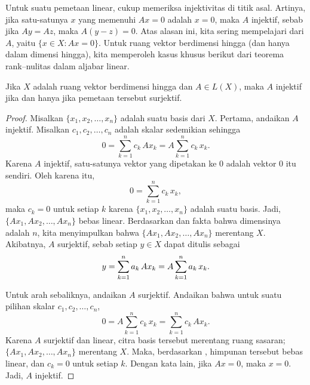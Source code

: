 Untuk suatu pemetaan linear, cukup memeriksa injektivitas di titik asal.
Artinya, jika satu-satunya $x$ yang memenuhi $Ax =0$ adalah $x=0$, maka $A$ injektif,
sebab jika $Ay=Az$, maka $A(y-z) = 0$.  Atas alasan ini, 
kita sering mempelajari \emph{} dari $A$, yaitu
$\{ x \in X : Ax = 0 \}$.
Untuk ruang vektor berdimensi hingga (dan hanya dalam dimensi hingga),
kita memperoleh kasus khusus berikut dari
teorema rank--nulitas dalam aljabar linear.

\begin{prop} \label{mv:prop:lin11onto}
Jika $X$ adalah ruang vektor berdimensi hingga dan $A \in L(X)$, maka $A$ injektif jika dan hanya jika pemetaan tersebut surjektif.
\end{prop}

\begin{proof}
Misalkan $\{ x_1,x_2,\ldots,x_n \}$ adalah suatu basis dari $X$.
Pertama, andaikan $A$ injektif.  Misalkan $c_1,c_2,\ldots,c_n$ adalah skalar sedemikian sehingga
\begin{equation*}
0 =
\sum_{k=1}^n c_k \, Ax_k =
A\sum_{k=1}^n c_k \, x_k 
.
\end{equation*}
Karena $A$ injektif,
satu-satunya vektor yang dipetakan ke 0 adalah vektor 0 itu sendiri.  
Oleh karena itu,
\begin{equation*}
0 =
\sum_{k=1}^n c_k \, x_k,
\end{equation*}
maka $c_k = 0$ untuk setiap $k$ karena $\{ x_1,x_2,\ldots,x_n \}$ adalah suatu basis.
Jadi, $\{ Ax_1, Ax_2, \ldots, Ax_n \}$ bebas linear.
Berdasarkan 
dan fakta bahwa dimensinya adalah $n$, kita menyimpulkan bahwa
$\{ Ax_1, Ax_2, \ldots, Ax_n \}$ merentang $X$.  Akibatnya, $A$ surjektif,
sebab setiap $y \in X$ dapat ditulis sebagai
\begin{equation*}
y = \sum_{k=1}^n a_k \, Ax_k =
A\sum_{k=1}^n a_k \, x_k .
\avoidbreak
\end{equation*}

Untuk arah sebaliknya, andaikan $A$ surjektif.
Andaikan bahwa untuk suatu pilihan skalar
$c_1,c_2,\ldots,c_n$,
\begin{equation*}
0 = A\sum_{k=1}^n c_k \, x_k =
\sum_{k=1}^n c_k \, Ax_k .
\end{equation*}
Karena $A$ surjektif dan linear, citra basis tersebut merentang ruang sasaran;
$\{ Ax_1, Ax_2, \ldots, Ax_n \}$ merentang $X$.
Maka, berdasarkan , himpunan tersebut bebas linear,
dan $c_k = 0$ untuk setiap $k$.  Dengan kata lain, jika $Ax = 0$, maka $x=0$.
Jadi, $A$ injektif.
\end{proof}


